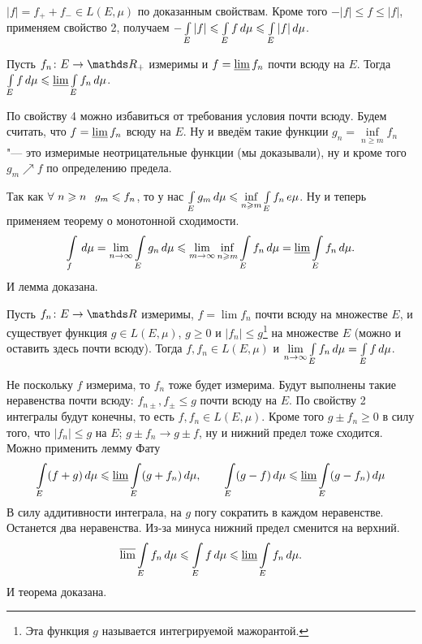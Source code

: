 \begin{Proof}
  $|f| = f_+ + f_-\in L(E,\mu)$ по доказанным свойствам. Кроме того $-|f|\le f\le |f|$, применяем свойство 2, получаем $-\int\limits_{E}|f|\leqslant \int\limits_{E}f\,d\mu\leqslant \int\limits_{E}|f|\,d\mu$.
\end{Proof}

\begin{Lem}[Фату]
  Пусть $f_n\colon E\to\R_+$ измеримы и $f = \varliminf f_n$ почти всюду на $E$. Тогда $\int\limits_{E}f\,d\mu\leqslant \varliminf\int\limits_{E}f_n\,d\mu$.
\end{Lem}

\begin{Proof}
  По свойству 4 можно избавиться от требования условия почти всюду. Будем считать, что $f=\varliminf f_n$ всюду на $E$. Ну и введём такие функции $g_n=\inf\limits_{n\ge m}f_n$ "--- это измеримые неотрицательные функции (мы доказывали), ну и кроме того $g_m\nearrow f$ по определению предела.

Так как $\forall\ n\ge n\pau g_m\le f_n$, то у нас $\int\limits_{E} g_m\,d\mu\leqslant \inf\limits_{n\geqslant m}\int\limits_{E}f_n\,e\mu$. Ну и теперь применяем теорему о монотонной сходимости.
 \[
  \int\limits_{f}\,d\mu = \lim\limits_{n\rightarrow\infty} \int\limits_{E}g_n\,d\mu\leqslant \lim\limits_{m\rightarrow\infty}\inf\limits_{n\geqslant m}\int\limits_{E}f_n\,d\mu = \varliminf\int\limits_{E}f_n\,d\mu.
\]
И лемма доказана.
\end{Proof}

\begin{The}
  Пусть $f_n\colon E\to\R$ измеримы, $f = \lim f_n$ почти всюду на множестве $E$, и существует функция $g\in L(E,\mu)$, $g\ge 0$ и $|f_n|\le g$\footnote{Эта функция $g$ называется интегрируемой мажорантой.} на множестве $E$ (можно и оставить здесь почти всюду). Тогда $f,f_n\in L(E,\mu)$ и $\lim\limits_{n\rightarrow\infty} \int\limits_{E}f_n\,d\mu = \int\limits_{E}f\,d\mu$.
\end{The}

\begin{Proof}
  Не поскольку $f$ измерима, то $f_n$ тоже будет измерима. Будут выполнены такие неравенства почти всюду: $f_{n\pm}, f_\pm\le g$ почти всюду на $E$. По свойству 2 интегралы будут конечны, то есть $f,f_n\in L(E,\mu)$. Кроме того $g\pm f_n\ge 0$ в силу того, что $|f_n|\le g$ на $E$; $g\pm f_n\to g\pm f$, ну и нижний предел тоже сходится. Можно применить лемму Фату
 \[
   \int\limits_{E}(f+g)\,d\mu\leqslant \varliminf\int\limits_{E}(g+f_n)\,d\mu,\qquad
   \int\limits_{E}(g-f)\,d\mu\leqslant \varliminf\int\limits_{E}(g-f_n)\,d\mu
 \]
В силу аддитивности интеграла, на $g$ погу сократить в каждом неравенстве. Останется два неравенства. Из-за минуса нижний предел сменится на верхний.
\[
  \varlimsup\int\limits_{E} f_n\,d\mu\leqslant \int\limits_{E}f\,d\mu\leqslant\varliminf\int\limits_{E}f_n\,d\mu.
\]
И теорема доказана.
\end{Proof}

